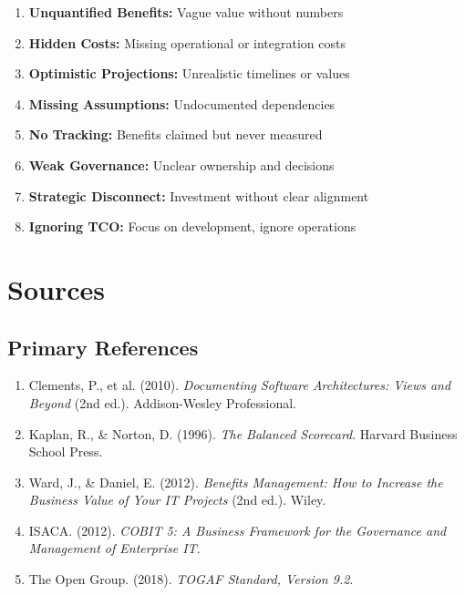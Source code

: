 \documentclass[11pt,letterpaper]{article}
\begin{document}
\begin{warningbox}
\begin{enumerate}[nosep]
    \item \textbf{Unquantified Benefits:} Vague value without numbers
    \item \textbf{Hidden Costs:} Missing operational or integration costs
    \item \textbf{Optimistic Projections:} Unrealistic timelines or values
    \item \textbf{Missing Assumptions:} Undocumented dependencies
    \item \textbf{No Tracking:} Benefits claimed but never measured
    \item \textbf{Weak Governance:} Unclear ownership and decisions
    \item \textbf{Strategic Disconnect:} Investment without clear alignment
    \item \textbf{Ignoring TCO:} Focus on development, ignore operations
\end{enumerate}
\end{warningbox}

\section{Sources}

\subsection{Primary References}

\begin{enumerate}
    \item Clements, P., et al. (2010). \textit{Documenting Software Architectures: Views and Beyond} (2nd ed.). Addison-Wesley Professional.
    
    \item Kaplan, R., \& Norton, D. (1996). \textit{The Balanced Scorecard}. Harvard Business School Press.
    
    \item Ward, J., \& Daniel, E. (2012). \textit{Benefits Management: How to Increase the Business Value of Your IT Projects} (2nd ed.). Wiley.
    
    \item ISACA. (2012). \textit{COBIT 5: A Business Framework for the Governance and Management of Enterprise IT}.
    
    \item The Open Group. (2018). \textit{TOGAF Standard, Version 9.2}.
\end{enumerate}
\end{document}
